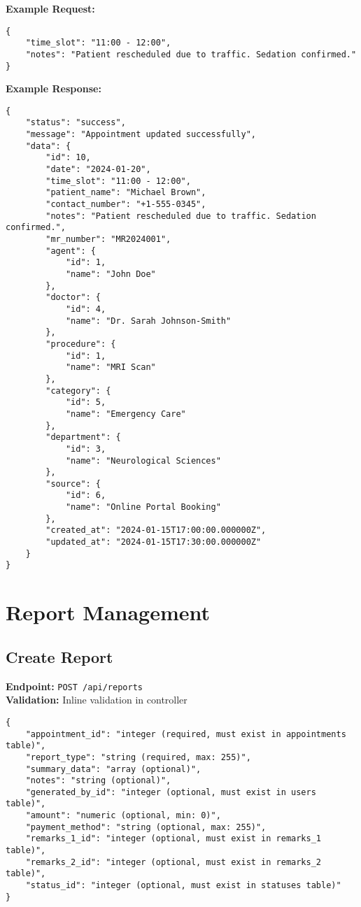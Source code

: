 \documentclass[12pt,a4paper]{article}
\begin{document}
\textbf{Example Request:}
\begin{lstlisting}[caption=Update Appointment Example Request]
{
    "time_slot": "11:00 - 12:00",
    "notes": "Patient rescheduled due to traffic. Sedation confirmed."
}
\end{lstlisting}

\textbf{Example Response:}
\begin{lstlisting}[caption=Update Appointment Example Response]
{
    "status": "success",
    "message": "Appointment updated successfully",
    "data": {
        "id": 10,
        "date": "2024-01-20",
        "time_slot": "11:00 - 12:00",
        "patient_name": "Michael Brown",
        "contact_number": "+1-555-0345",
        "notes": "Patient rescheduled due to traffic. Sedation confirmed.",
        "mr_number": "MR2024001",
        "agent": {
            "id": 1,
            "name": "John Doe"
        },
        "doctor": {
            "id": 4,
            "name": "Dr. Sarah Johnson-Smith"
        },
        "procedure": {
            "id": 1,
            "name": "MRI Scan"
        },
        "category": {
            "id": 5,
            "name": "Emergency Care"
        },
        "department": {
            "id": 3,
            "name": "Neurological Sciences"
        },
        "source": {
            "id": 6,
            "name": "Online Portal Booking"
        },
        "created_at": "2024-01-15T17:00:00.000000Z",
        "updated_at": "2024-01-15T17:30:00.000000Z"
    }
}
\end{lstlisting}

\section{Report Management}

\subsection{Create Report}
\textbf{Endpoint:} \texttt{POST /api/reports}\\
\textbf{Validation:} Inline validation in controller

\begin{lstlisting}[caption=Create Report Request Body]
{
    "appointment_id": "integer (required, must exist in appointments table)",
    "report_type": "string (required, max: 255)",
    "summary_data": "array (optional)",
    "notes": "string (optional)",
    "generated_by_id": "integer (optional, must exist in users table)",
    "amount": "numeric (optional, min: 0)",
    "payment_method": "string (optional, max: 255)",
    "remarks_1_id": "integer (optional, must exist in remarks_1 table)",
    "remarks_2_id": "integer (optional, must exist in remarks_2 table)",
    "status_id": "integer (optional, must exist in statuses table)"
}
\end{lstlisting}
\end{document}
